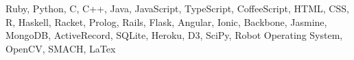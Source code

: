 

\begin{cvparagraph}
Ruby, Python, C, C++, Java, JavaScript, TypeScript, CoffeeScript, HTML, CSS, R,
Haskell, Racket, Prolog, Rails, Flask, Angular, Ionic, Backbone, Jasmine, MongoDB,
ActiveRecord, SQLite, Heroku, D3, SciPy, Robot Operating System, OpenCV, SMACH, LaTex
\end{cvparagraph}
